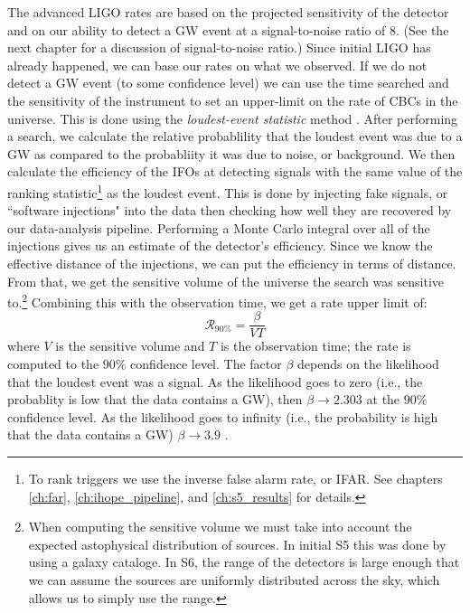 The advanced \ac{LIGO} rates are based on the projected sensitivity of the detector and on our ability to detect a \ac{GW} event at a signal-to-noise ratio of 8. (See the next chapter for a discussion of signal-to-noise ratio.) Since initial \ac{LIGO} has already happened, we can base our rates on what we observed. If we do not detect a \ac{GW} event (to some confidence level) we can use the time searched and the sensitivity of the instrument to set an upper-limit on the rate of \acp{CBC} in the universe. This is done using the \emph{loudest-event statistic} method \cite{ref:uls}. After performing a search, we calculate the relative probablility that the loudest event was due to a \ac{GW} as compared to the probabliity it was due to noise, or background. We then calculate the efficiency of the \acp{IFO} at detecting signals with the same value of the ranking statistic\footnote{To rank triggers we use the inverse false alarm rate, or IFAR. See chapters \ref{ch:far}, \ref{ch:ihope_pipeline}, and \ref{ch:s5_results} for details.} as the loudest event. This is done by injecting fake signals, or ``software injections" into the data then checking how well they are recovered by our data-analysis pipeline. Performing a Monte Carlo integral over all of the injections gives us an estimate of the detector's efficiency. Since we know the effective distance of the injections, we can put the efficiency in terms of distance. From that, we get the sensitive volume of the universe the search was sensitive to.\footnote{When computing the sensitive volume we must take into account the expected astophysical distribution of sources. In initial \ac{S5} this was done by using a galaxy cataloge. In \ac{S6}, the range of the detectors is large enough that we can assume the sources are uniformly distributed across the sky, which allows us to simply use the range.} Combining this with the observation time, we get a rate upper limit of:
\begin{equation}
\label{eqn:rate_ul}
\mathcal{R}_{90\%} = \frac{\beta}{VT}
\end{equation}
where $V$ is the sensitive volume and $T$ is the observation time; the rate is computed to the $90\%$ confidence level. The factor $\beta$ depends on the likelihood that the loudest event was a signal. As the likelihood goes to zero (i.e., the probablity is low that the data contains a \ac{GW}), then $\beta \rightarrow 2.303$ at the $90\%$ confidence level. As the likelihood goes to infinity (i.e., the probability is high that the data contains a \ac{GW}) $\beta \rightarrow 3.9$ \cite{ref:uls}.

